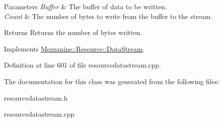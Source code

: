 \begin{DoxyParams}{Parameters}
{\em Buffer} & The buffer of data to be written. \\
\hline
{\em Count} & The number of bytes to write from the buffer to the stream. \\
\hline
\end{DoxyParams}
\begin{DoxyReturn}{Returns}
Returns the number of bytes written. 
\end{DoxyReturn}
 

Implements \hyperlink{classMezzanine_1_1Resource_1_1DataStream_aafdbe4aeb8e8743d514fbd1075a30859}{Mezzanine::Resource::DataStream}.



Definition at line 601 of file resourcedatastream.cpp.



The documentation for this class was generated from the following files:\begin{DoxyCompactItemize}
\item 
resourcedatastream.h\item 
resourcedatastream.cpp\end{DoxyCompactItemize}
